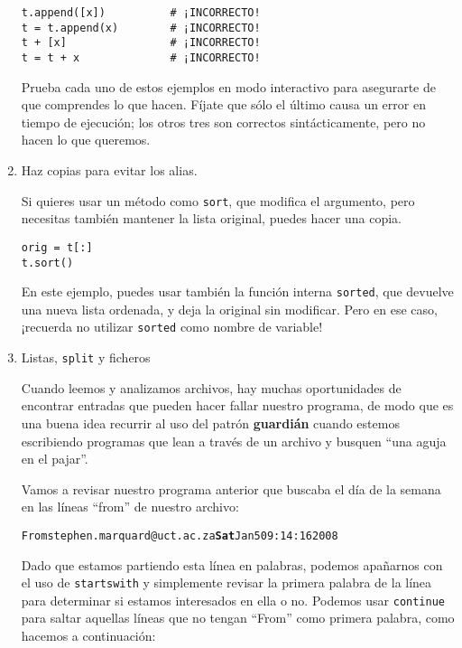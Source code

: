 \begin{enumerate}
\beforeverb
\begin{verbatim}
t.append([x])          # ¡INCORRECTO!
t = t.append(x)        # ¡INCORRECTO!
t + [x]                # ¡INCORRECTO!
t = t + x              # ¡INCORRECTO!
\end{verbatim}
\afterverb

Prueba cada uno de estos ejemplos en modo interactivo para asegurarte
de que comprendes lo que hacen. Fíjate que sólo el último
causa un error en tiempo de ejecución; los otros tres son correctos sintácticamente, pero
no hacen lo que queremos.


\item Haz copias para evitar los alias.


Si quieres usar un método como {\tt sort}, que modifica
el argumento, pero necesitas también mantener la lista original,
puedes hacer una copia.

\beforeverb
\begin{verbatim}
orig = t[:]
t.sort()
\end{verbatim}
\afterverb

En este ejemplo, puedes usar también la función interna {\tt sorted},
que devuelve una nueva lista ordenada, y deja la original sin modificar.
Pero en ese caso, ¡recuerda no utilizar {\tt sorted} como nombre de
variable!

\item Listas, {\tt split} y ficheros

Cuando leemos y analizamos archivos, hay muchas oportunidades
de encontrar entradas que pueden hacer fallar nuestro programa, de modo que
es una buena idea recurrir al uso del patrón {\bf guardián} cuando
estemos escribiendo programas que lean a través de un archivo
y busquen ``una aguja en el pajar''.

Vamos a revisar nuestro programa anterior que buscaba el día de la semana
en las líneas ``from'' de nuestro archivo:

\beforeverb
\begin{alltt}
From stephen.marquard@uct.ac.za {\bf Sat} Jan  5 09:14:16 2008
\end{alltt}
\afterverb

Dado que estamos partiendo esta línea en palabras, podemos apañarnos
con el uso de {\tt startswith} y simplemente revisar la
primera palabra de la línea para determinar si estamos interesados
en ella o no. Podemos usar {\tt continue} para saltar aquellas
líneas que no tengan ``From'' como primera palabra, como hacemos
a continuación:


\end{enumerate}
